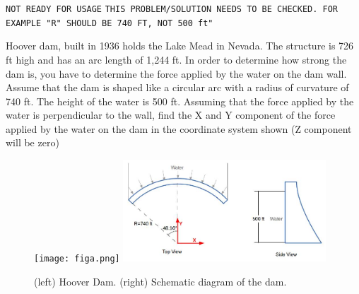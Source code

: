 
\texttt{NOT READY FOR USAGE}
\texttt{THIS PROBLEM/SOLUTION NEEDS TO BE CHECKED.  FOR EXAMPLE "R" SHOULD BE 740 FT, NOT 500 ft"}


Hoover dam, built in 1936 holds the Lake Mead in Nevada. The structure is 726 ft high and has an arc length
of 1,244 ft. In order to determine how strong the dam is, you have to determine the force applied by the water
on the dam wall. Assume that the dam is shaped like a circular arc with a radius of curvature of 740 ft. The
height of the water is 500 ft. Assuming that the force applied by the water is perpendicular to the wall, find
the X and Y component of the force applied by the water on the dam in the coordinate system shown (Z
component will be zero)

\begin{figure}[ht!]
  \centering
  \texttt{[image: figa.png]}
  \includegraphics[height=1.5in]{figb.png}
  \caption*{(left) Hoover Dam.  (right) Schematic diagram of the dam.}
\end{figure}

